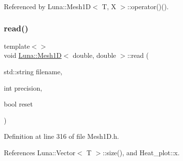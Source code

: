 Referenced by Luna\+::\+Mesh1\+D$<$ T, X $>$\+::operator()().

\mbox{\label{classLuna_1_1Mesh1D_a44c64e8949c67fd0274634c6c0df0d3b}} 
\subsubsection{\texorpdfstring{read()}{read()}\hspace{0.1cm}{\footnotesize\ttfamily [2/2]}}
{\footnotesize\ttfamily template$<$$>$ \\
void \hyperlink{classLuna_1_1Mesh1D}{Luna\+::\+Mesh1D}$<$ double, double $>$\+::read (\begin{DoxyParamCaption}\item[{std\+::string}]{filename,  }\item[{int}]{precision,  }\item[{bool}]{reset }\end{DoxyParamCaption})\hspace{0.3cm}{\ttfamily [inline]}}



Definition at line 316 of file Mesh1\+D.\+h.



References Luna\+::\+Vector$<$ T $>$\+::size(), and Heat\+\_\+plot\+::x.


